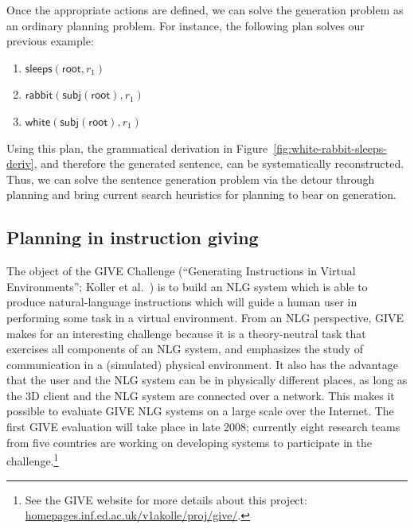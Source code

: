Once the appropriate actions are defined, we can solve the generation
problem as an ordinary planning problem. For instance, the following plan
solves our previous example:
%
\begin{enumerate}
\item $\mathsf{sleeps}(\mathsf{root}, r_1)$
\item $\mathsf{rabbit}(\mathsf{subj}(\mathsf{root}), r_1)$
\item $\mathsf{white}(\mathsf{subj}(\mathsf{root}), r_1)$
\end{enumerate}
%
Using this plan, the grammatical derivation in
Figure~\ref{fig:white-rabbit-sleeps-deriv}, and therefore the generated
sentence, can be systematically reconstructed. Thus, we can solve the
sentence generation problem via the detour through planning and bring
current search heuristics for planning to bear on generation.



\subsection{Planning in instruction giving}

The object of the GIVE Challenge (``Generating Instructions in Virtual
Environments''; Koller et al.\ \citeyear{alexander07:_shared_task_propos})
is to build an NLG system which is able to produce natural-language
instructions which will guide a human user in performing some task in a
virtual environment. From an NLG perspective, GIVE makes for an
interesting challenge because it is a theory-neutral task that exercises
all components of an NLG system, and emphasizes the study of communication
in a (simulated) physical environment. It also has the advantage that the
user and the NLG system can be in physically different places, as long as
the 3D client and the NLG system are connected over a network. This makes
it possible to evaluate GIVE NLG systems on a large scale over the
Internet. The first GIVE evaluation will take place in late 2008;
currently eight research teams from five countries are working on
developing systems to participate in the challenge.\footnote{See the GIVE
 website for more details about this project:
 \url{homepages.inf.ed.ac.uk/v1akolle/proj/give/}.}


